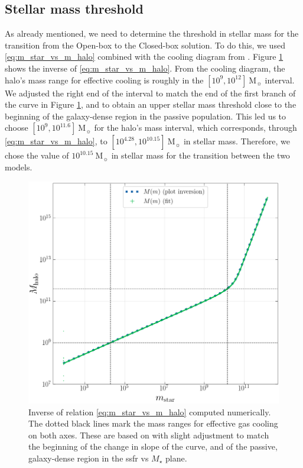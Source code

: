 \documentclass[fleqn, usenatbib]{mnras}
\begin{document}
\subsection{Stellar mass threshold}

As already mentioned, we need to determine the threshold in stellar mass for the transition from the Open-box to the Closed-box solution. To do this, we used \eqref{eq:m_star_vs_m_halo} combined with the cooling diagram from \citet[Figure 8.6]{Mo2010}. Figure \ref{fig:m_halo_vs_m_star} shows the inverse of \eqref{eq:m_star_vs_m_halo}. From the cooling diagram, the halo's mass range for effective cooling is roughly in the \([10^9, 10^{12}]\ \mathrm{M_{\sun}}\) interval. We adjusted the right end of the interval to match the end of the first branch of the curve in Figure \ref{fig:m_halo_vs_m_star}, and to obtain an upper stellar mass threshold close to the beginning of the galaxy-dense region in the passive population. This led us to choose \([10^9, 10^{11.6}]\ \mathrm{M_{\sun}}\) for the halo's mass interval, which corresponds, through \eqref{eq:m_star_vs_m_halo}, to \([10^{4.28}, 10^{10.15}]\ \mathrm{M_{\sun}}\) in stellar mass. Therefore, we chose the value of \(10^{10.15}\ \mathrm{M_{\sun}}\) in stellar mass for the transition between the two models.
\begin{figure}
	\includegraphics[width=\columnwidth]{images/m_halo_vs_m_star.png}
	\caption{Inverse of relation \eqref{eq:m_star_vs_m_halo} computed numerically. The dotted black lines mark the mass ranges for effective gas cooling on both axes. These are based on \citet[Figure 8.6]{Mo2010} with slight adjustment to match the beginning of the change in slope of the curve, and of the passive, galaxy-dense region in the \acrshort{ssfr} vs \(M_{\star}\) plane.}
	\label{fig:m_halo_vs_m_star}
\end{figure}
\end{document}
